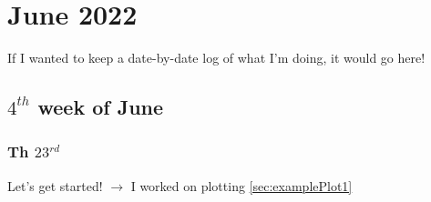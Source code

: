 \section{June 2022}
If I wanted to keep a date-by-date log of what I'm
doing, it would go here!
\subsection{$4^{th}$ week of June}
\subsubsection{Th $23^{rd}$}
Let's get started! $\rightarrow$ I worked on plotting
\cref{sec:examplePlot1}
